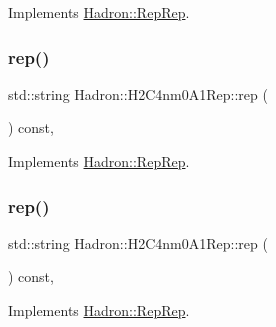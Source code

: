 Implements \mbox{\hyperlink{structHadron_1_1RepRep_ab3213025f6de249f7095892109575fde}{Hadron\+::\+Rep\+Rep}}.

\mbox{\label{structHadron_1_1H2C4nm0A1Rep_af78536d0069f367b69654854815b015d}} 
\subsubsection{\texorpdfstring{rep()}{rep()}\hspace{0.1cm}{\footnotesize\ttfamily [2/5]}}
{\footnotesize\ttfamily std\+::string Hadron\+::\+H2\+C4nm0\+A1\+Rep\+::rep (\begin{DoxyParamCaption}{ }\end{DoxyParamCaption}) const\hspace{0.3cm}{\ttfamily [inline]}, {\ttfamily [virtual]}}



Implements \mbox{\hyperlink{structHadron_1_1RepRep_ab3213025f6de249f7095892109575fde}{Hadron\+::\+Rep\+Rep}}.

\mbox{\label{structHadron_1_1H2C4nm0A1Rep_af78536d0069f367b69654854815b015d}} 
\subsubsection{\texorpdfstring{rep()}{rep()}\hspace{0.1cm}{\footnotesize\ttfamily [3/5]}}
{\footnotesize\ttfamily std\+::string Hadron\+::\+H2\+C4nm0\+A1\+Rep\+::rep (\begin{DoxyParamCaption}{ }\end{DoxyParamCaption}) const\hspace{0.3cm}{\ttfamily [inline]}, {\ttfamily [virtual]}}



Implements \mbox{\hyperlink{structHadron_1_1RepRep_ab3213025f6de249f7095892109575fde}{Hadron\+::\+Rep\+Rep}}.

\mbox{\label{structHadron_1_1H2C4nm0A1Rep_af78536d0069f367b69654854815b015d}} 
